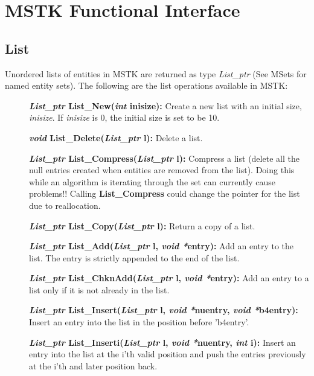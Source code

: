 \documentclass[12pt]{article}
\begin{document}
\newpage
\section{MSTK Functional Interface}
\subsection{List}

Unordered lists of entities in MSTK are returned as type {\em
  List\_ptr} (See MSets for named entity sets). The following are the
list operations available in MSTK:

\begin{description}
\item[]{\bf {\em List\_ptr} List\_New({\em int} inisize):} Create a
new list with an initial size, {\em inisize}. If {\em inisize} is
0, the initial size is set to be 10.

\item[]{\bf {\em void} List\_Delete({\em List\_ptr} l):} Delete a list.
  
\item[]{\bf {\em List\_ptr} List\_Compress({\em List\_ptr}
    l):} Compress a list (delete all the null entries created when
  entities are removed from the list).  Doing this while an algorithm
  is iterating through the set can currently cause problems!! Calling
  {\bf List\_Compress} could change the pointer for the list due to
  reallocation.

\item[]{\bf {\em List\_ptr} List\_Copy({\em List\_ptr} l):} Return a
copy of a list.

\item[]{\bf {\em List\_ptr} List\_Add({\em List\_ptr} l, {\em void
  *}entry):} Add an entry to the list. The entry is strictly appended to the end
of the list.

\item[]{\bf {\em List\_ptr} List\_ChknAdd({\em List\_ptr} l,
{\em void *}entry):} Add an entry to a list only if it is not already
in the list.

\item[]{\bf {\em List\_ptr} List\_Insert({\em List\_ptr} l,
{\em void *}nuentry, {\em void *}b4entry):} Insert an entry into the list in the position before 'b4entry'.

\item[]{\bf {\em List\_ptr} List\_Inserti({\em List\_ptr} l,
    {\em void *}nuentry, {\em int} i):} Insert an entry into the
  list at the i'th valid position and push the entries previously at
  the i'th and later position back.


\end{description}
\end{document}
